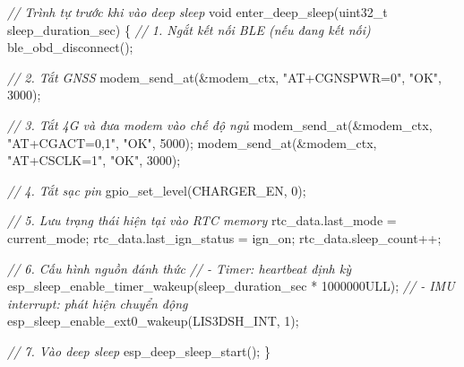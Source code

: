\documentclass[13pt,a4paper]{extarticle}
\newenvironment{Shaded}{}{}
\newcommand{\BuiltInTok}[1]{\textcolor[rgb]{0.00,0.50,0.00}{#1}}
\newcommand{\CommentTok}[1]{\textcolor[rgb]{0.38,0.63,0.69}{\textit{#1}}}
\newcommand{\DataTypeTok}[1]{\textcolor[rgb]{0.56,0.13,0.00}{#1}}
\newcommand{\DecValTok}[1]{\textcolor[rgb]{0.25,0.63,0.44}{#1}}
\newcommand{\NormalTok}[1]{#1}
\newcommand{\OperatorTok}[1]{\textcolor[rgb]{0.40,0.40,0.40}{#1}}
\newcommand{\StringTok}[1]{\textcolor[rgb]{0.25,0.44,0.63}{#1}}
\renewcommand{\\}{\thesislongtableorignewline\hline}%
\begin{document}
\begin{Shaded}
\begin{Highlighting}[]
\CommentTok{// Trình tự trước khi vào deep sleep}
\DataTypeTok{void}\NormalTok{ enter\_deep\_sleep}\OperatorTok{(}\DataTypeTok{uint32\_t}\NormalTok{ sleep\_duration\_sec}\OperatorTok{)}
\OperatorTok{\{}
    \CommentTok{// 1. Ngắt kết nối BLE (nếu đang kết nối)}
\NormalTok{    ble\_obd\_disconnect}\OperatorTok{();}

    \CommentTok{// 2. Tắt GNSS}
\NormalTok{    modem\_send\_at}\OperatorTok{(\&}\NormalTok{modem\_ctx}\OperatorTok{,} \StringTok{"AT+CGNSPWR=0"}\OperatorTok{,} \StringTok{"OK"}\OperatorTok{,} \DecValTok{3000}\OperatorTok{);}

    \CommentTok{// 3. Tắt 4G và đưa modem vào chế độ ngủ}
\NormalTok{    modem\_send\_at}\OperatorTok{(\&}\NormalTok{modem\_ctx}\OperatorTok{,} \StringTok{"AT+CGACT=0,1"}\OperatorTok{,} \StringTok{"OK"}\OperatorTok{,} \DecValTok{5000}\OperatorTok{);}
\NormalTok{    modem\_send\_at}\OperatorTok{(\&}\NormalTok{modem\_ctx}\OperatorTok{,} \StringTok{"AT+CSCLK=1"}\OperatorTok{,} \StringTok{"OK"}\OperatorTok{,} \DecValTok{3000}\OperatorTok{);}

    \CommentTok{// 4. Tắt sạc pin}
\NormalTok{    gpio\_set\_level}\OperatorTok{(}\NormalTok{CHARGER\_EN}\OperatorTok{,} \DecValTok{0}\OperatorTok{);}

    \CommentTok{// 5. Lưu trạng thái hiện tại vào RTC memory}
\NormalTok{    rtc\_data}\OperatorTok{.}\NormalTok{last\_mode       }\OperatorTok{=}\NormalTok{ current\_mode}\OperatorTok{;}
\NormalTok{    rtc\_data}\OperatorTok{.}\NormalTok{last\_ign\_status }\OperatorTok{=}\NormalTok{ ign\_on}\OperatorTok{;}
\NormalTok{    rtc\_data}\OperatorTok{.}\NormalTok{sleep\_count}\OperatorTok{++;}

    \CommentTok{// 6. Cấu hình nguồn đánh thức}
    \CommentTok{//    {-} Timer: heartbeat định kỳ}
\NormalTok{    esp\_sleep\_enable\_timer\_wakeup}\OperatorTok{(}\NormalTok{sleep\_duration\_sec }\OperatorTok{*} \DecValTok{1000000}\BuiltInTok{ULL}\OperatorTok{);}
    \CommentTok{//    {-} IMU interrupt: phát hiện chuyển động}
\NormalTok{    esp\_sleep\_enable\_ext0\_wakeup}\OperatorTok{(}\NormalTok{LIS3DSH\_INT}\OperatorTok{,} \DecValTok{1}\OperatorTok{);}

    \CommentTok{// 7. Vào deep sleep}
\NormalTok{    esp\_deep\_sleep\_start}\OperatorTok{();}
\OperatorTok{\}}
\end{Highlighting}
\end{Shaded}
\end{document}
